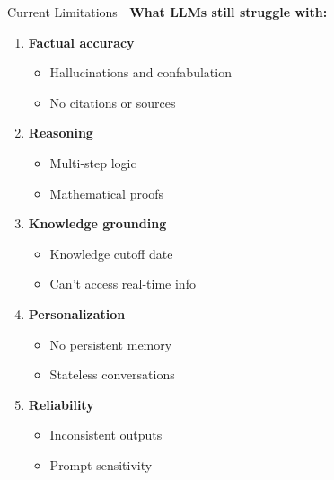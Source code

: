 \documentclass[aspectratio=169]{beamer}
\begin{document}
\begin{frame}[shrink=10]{Current Limitations 🚧}
    \textbf{What LLMs still struggle with:}

    \vspace{0.3cm}

    \begin{enumerate}\setlength{\itemsep}{0pt}
        \item \textbf{Factual accuracy}
        \begin{itemize}\setlength{\itemsep}{0pt}
            \item Hallucinations and confabulation
            \item No citations or sources
        \end{itemize}

        \item \textbf{Reasoning}
        \begin{itemize}\setlength{\itemsep}{0pt}
            \item Multi-step logic
            \item Mathematical proofs
        \end{itemize}

        \item \textbf{Knowledge grounding}
        \begin{itemize}\setlength{\itemsep}{0pt}
            \item Knowledge cutoff date
            \item Can't access real-time info
        \end{itemize}

        \item \textbf{Personalization}
        \begin{itemize}\setlength{\itemsep}{0pt}
            \item No persistent memory
            \item Stateless conversations
        \end{itemize}

        \item \textbf{Reliability}
        \begin{itemize}\setlength{\itemsep}{0pt}
            \item Inconsistent outputs
            \item Prompt sensitivity
        \end{itemize}
    \end{enumerate}
\end{frame}
\end{document}
